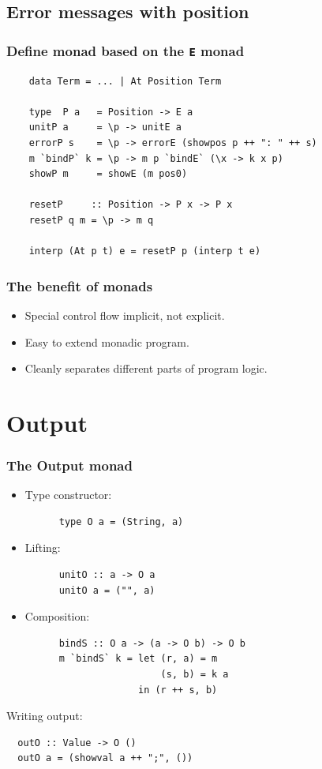 \documentclass{beamer}
\begin{document}
\subsection{Error messages with position}
\begin{frame}[t, fragile]
  \frametitle{Define monad based on the \texttt{E} monad}
  \begin{lstlisting}
    data Term = ... | At Position Term
    
    type  P a   = Position -> E a
    unitP a     = \p -> unitE a
    errorP s    = \p -> errorE (showpos p ++ ": " ++ s)
    m `bindP` k = \p -> m p `bindE` (\x -> k x p)
    showP m     = showE (m pos0)

    resetP     :: Position -> P x -> P x
    resetP q m = \p -> m q

    interp (At p t) e = resetP p (interp t e)
  \end{lstlisting}
  
  \subsubsection{The benefit of monads}
  \begin{itemize}
    \item Special control flow implicit, not explicit.
    \item Easy to extend monadic program.
    \item Cleanly separates different parts of program logic.
  \end{itemize}
\end{frame}


\section{Output}
\begin{frame}[t, fragile]
  \frametitle{The Output monad}
  \begin{itemize}
  \item<1-> Type constructor: \\
    \begin{lstlisting}
      type O a = (String, a)
    \end{lstlisting}
  \item<1-> Lifting: 
    \begin{lstlisting}
      unitO :: a -> O a
      unitO a = ("", a)
    \end{lstlisting}
  \item<1-> Composition:
    \begin{lstlisting}
      bindS :: O a -> (a -> O b) -> O b
      m `bindS` k = let (r, a) = m
                        (s, b) = k a
                    in (r ++ s, b)
    \end{lstlisting}
  \end{itemize}  

Writing output:

\begin{lstlisting}
  outO :: Value -> O ()
  outO a = (showval a ++ ";", ())
\end{lstlisting}

\end{frame}
\end{document}
